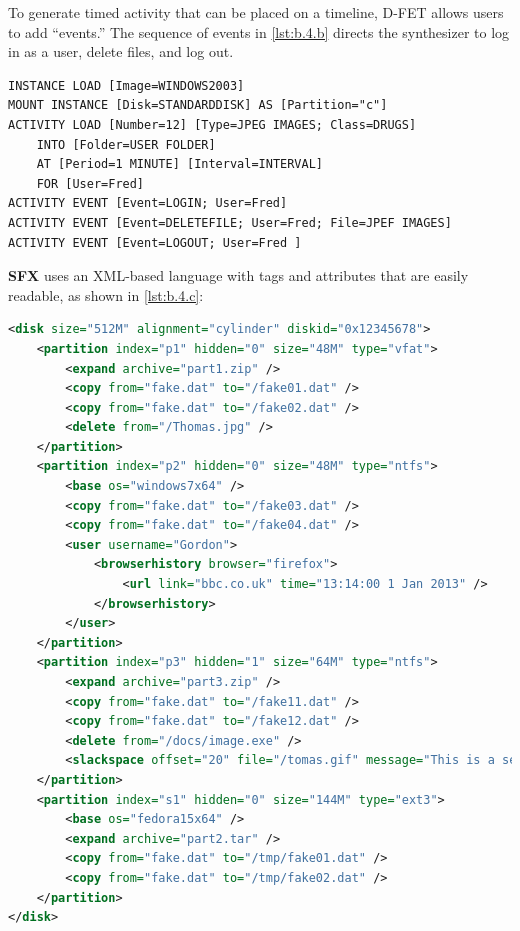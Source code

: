 \documentclass[letterpaper,12pt]{report}
\begin{document}
To generate timed activity that can be placed on a timeline, D-FET
allows users to add ``events.'' The sequence of events in
\autoref{lst:b.4.b} directs the synthesizer to log in as a user, delete
files, and log out.

\begin{lstlisting}[label={lst:b.4.b}, caption={Extension of the D-FET declarative scenario with events \cite{williamCloudbasedDigitalForensics2011}}, ]
INSTANCE LOAD [Image=WINDOWS2003] 
MOUNT INSTANCE [Disk=STANDARDDISK] AS [Partition="c"] 
ACTIVITY LOAD [Number=12] [Type=JPEG IMAGES; Class=DRUGS] 
    INTO [Folder=USER FOLDER] 
    AT [Period=1 MINUTE] [Interval=INTERVAL] 
    FOR [User=Fred]
ACTIVITY EVENT [Event=LOGIN; User=Fred] 
ACTIVITY EVENT [Event=DELETEFILE; User=Fred; File=JPEF IMAGES] 
ACTIVITY EVENT [Event=LOGOUT; User=Fred ]
\end{lstlisting}

\textbf{SFX} \cite{russellForensicImageDescription2012} uses an
XML-based language with tags and attributes that are easily readable, as
shown in \autoref{lst:b.4.c}:

\begin{lstlisting}[label={lst:b.4.c}, caption={Sample SFX declarative scenario expressed as XML \cite{russellForensicImageDescription2012}}, language=XML]
<disk size="512M" alignment="cylinder" diskid="0x12345678">
    <partition index="p1" hidden="0" size="48M" type="vfat">
        <expand archive="part1.zip" />
        <copy from="fake.dat" to="/fake01.dat" />
        <copy from="fake.dat" to="/fake02.dat" />
        <delete from="/Thomas.jpg" />
    </partition>
    <partition index="p2" hidden="0" size="48M" type="ntfs">
        <base os="windows7x64" />
        <copy from="fake.dat" to="/fake03.dat" />
        <copy from="fake.dat" to="/fake04.dat" />
        <user username="Gordon">
            <browserhistory browser="firefox">
                <url link="bbc.co.uk" time="13:14:00 1 Jan 2013" />
            </browserhistory>
        </user>
    </partition>
    <partition index="p3" hidden="1" size="64M" type="ntfs">
        <expand archive="part3.zip" />
        <copy from="fake.dat" to="/fake11.dat" />
        <copy from="fake.dat" to="/fake12.dat" />
        <delete from="/docs/image.exe" />
        <slackspace offset="20" file="/tomas.gif" message="This is a secret message" />
    </partition>
    <partition index="s1" hidden="0" size="144M" type="ext3">
        <base os="fedora15x64" />
        <expand archive="part2.tar" />
        <copy from="fake.dat" to="/tmp/fake01.dat" />
        <copy from="fake.dat" to="/tmp/fake02.dat" />
    </partition>
</disk>
\end{lstlisting}
\end{document}
